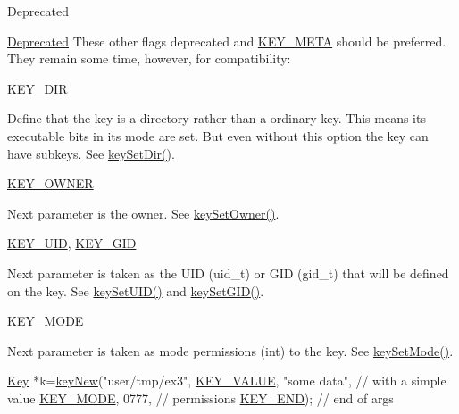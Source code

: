 \begin{DoxyRefDesc}{Deprecated}
\item[\hyperlink{deprecated__deprecated000002}{Deprecated}]These other flags deprecated and \hyperlink{group__key_gga91fb3178848bd682000958089abbaf40a040582834bb2d90049947d7ef74e87e2}{K\-E\-Y\-\_\-\-M\-E\-T\-A} should be preferred. They remain some time, however, for compatibility\-:
\begin{DoxyItemize}
\item \hyperlink{group__key_gga91fb3178848bd682000958089abbaf40a9e43e47c8a21478538e2d20e049981d5}{K\-E\-Y\-\_\-\-D\-I\-R} \par
 Define that the key is a directory rather than a ordinary key. This means its executable bits in its mode are set. But even without this option the key can have subkeys. See \hyperlink{group__keymeta_gaae575bd86a628a15ee45baa860522e75}{key\-Set\-Dir()}.
\item \hyperlink{group__key_gga91fb3178848bd682000958089abbaf40a77ca60362fa8daca8d5347db4385068b}{K\-E\-Y\-\_\-\-O\-W\-N\-E\-R} \par
 Next parameter is the owner. See \hyperlink{group__keyname_ga88d6ec200ba0707b7c1b4a88133d2be4}{key\-Set\-Owner()}.
\item \hyperlink{group__key_gga91fb3178848bd682000958089abbaf40a28f01a87d65f065172f734c9c9446c0e}{K\-E\-Y\-\_\-\-U\-I\-D}, \hyperlink{group__key_gga91fb3178848bd682000958089abbaf40ac0628bbaba7c837ca73323681393d15f}{K\-E\-Y\-\_\-\-G\-I\-D} \par
 Next parameter is taken as the U\-I\-D (uid\-\_\-t) or G\-I\-D (gid\-\_\-t) that will be defined on the key. See \hyperlink{group__keymeta_gab5f284f5ecd261e0a290095f50ba1af7}{key\-Set\-U\-I\-D()} and \hyperlink{group__keymeta_ga9e3d0fb3f7ba906e067727b9155d22e3}{key\-Set\-G\-I\-D()}.
\item \hyperlink{group__key_gga91fb3178848bd682000958089abbaf40a1b0a91ff3a855d6993930ebf0abaa518}{K\-E\-Y\-\_\-\-M\-O\-D\-E} \par
 Next parameter is taken as mode permissions (int) to the key. See \hyperlink{group__keymeta_ga8803037e35b9da1ce492323a88ff6bc3}{key\-Set\-Mode()}. 
\begin{DoxyCodeInclude}
\hyperlink{classkdb_1_1Key_a5679f5cae63caddd64a60388b9cc77fa}{Key} *k=\hyperlink{group__key_gad23c65b44bf48d773759e1f9a4d43b89}{keyNew}(\textcolor{stringliteral}{"user/tmp/ex3"},
        \hyperlink{group__key_gga91fb3178848bd682000958089abbaf40ac66e4a49d09212b79f5754ca6db5bd2e}{KEY\_VALUE}, \textcolor{stringliteral}{"some data"},    \textcolor{comment}{// with a simple value}
        \hyperlink{group__key_gga91fb3178848bd682000958089abbaf40a1b0a91ff3a855d6993930ebf0abaa518}{KEY\_MODE}, 0777,            \textcolor{comment}{// permissions}
        \hyperlink{group__key_gga91fb3178848bd682000958089abbaf40aa8adb6fcb92dec58fb19410eacfdd403}{KEY\_END});                  \textcolor{comment}{// end of args}
\end{DoxyCodeInclude}


\end{DoxyItemize}
\end{DoxyRefDesc}
